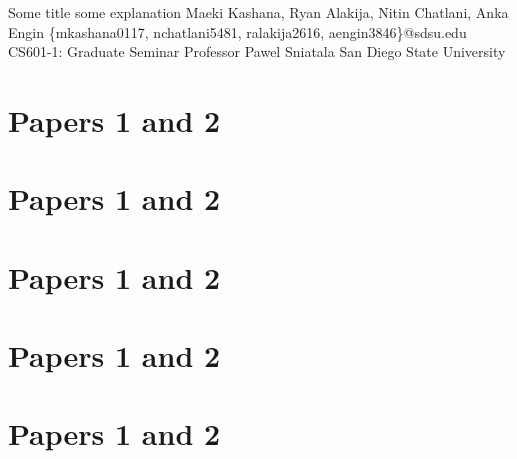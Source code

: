 \documentclass[12]{IEEE}
\begin{document}
\TitleOne
{Some title}
{some explanation}
{Maeki Kashana, Ryan Alakija, Nitin Chatlani, Anka Engin}
{\{mkashana0117, nchatlani5481, ralakija2616, aengin3846\}@sdsu.edu}
{CS601-1: Graduate Seminar}
{Professor Pawel Sniatala}
{San Diego State University}


\section{Papers 1 and 2}





\section{Papers 1 and 2}





\section{Papers 1 and 2}





\section{Papers 1 and 2}







\section{Papers 1 and 2}






\newpage
\printbibliography
\end{document}
